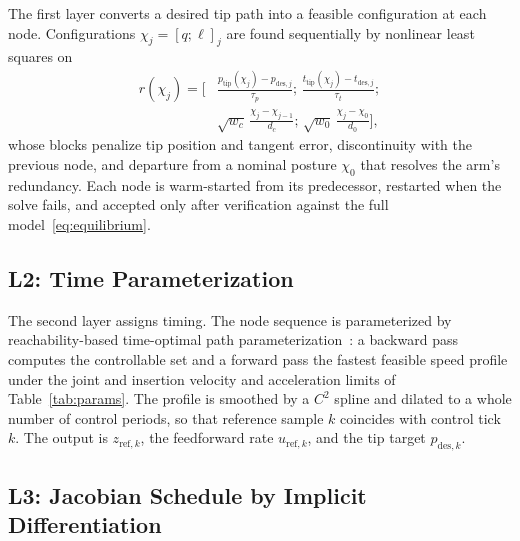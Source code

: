 \documentclass[journal]{IEEEtran}
\begin{document}
The first layer converts a desired tip path into a feasible configuration
at each node. Configurations $\chi_j=[q;\ell]_j$ are found sequentially by
nonlinear least squares on
\begin{equation}
\begin{aligned}
r(\chi_j)=\Big[&\tfrac{p_{\mathrm{tip}}(\chi_j)-p_{\mathrm{des},j}}{\tau_p};\,
\tfrac{t_{\mathrm{tip}}(\chi_j)-t_{\mathrm{des},j}}{\tau_t};\\
&\sqrt{w_c}\,\tfrac{\chi_j-\chi_{j-1}}{d_c};\,
\sqrt{w_0}\,\tfrac{\chi_j-\chi_0}{d_0}\Big],
\end{aligned}
\label{eq:planner}
\end{equation}
whose blocks penalize tip position and tangent error, discontinuity with
the previous node, and departure from a nominal posture $\chi_0$ that
resolves the arm's redundancy. Each node is warm-started from its
predecessor, restarted when the solve fails, and accepted only after
verification against the full model~\eqref{eq:equilibrium}.

\subsection{L2: Time Parameterization}
\label{sec:l2}

The second layer assigns timing. The node sequence is parameterized by
reachability-based time-optimal path
parameterization~\cite{bobrow1985timeoptimal,shinmckay1985minimumtime,
phampham2018reachability}: a backward pass computes the controllable set
and a forward pass the fastest feasible speed profile under the joint and
insertion velocity and acceleration limits of Table~\ref{tab:params}. The
profile is smoothed by a $C^2$ spline and dilated to a whole number of
control periods, so that reference sample $k$ coincides with control tick
$k$. The output is $z_{\mathrm{ref},k}$, the feedforward rate
$u_{\mathrm{ref},k}$, and the tip target $p_{\mathrm{des},k}$.

\subsection{L3: Jacobian Schedule by Implicit Differentiation}
\label{sec:l3}
\end{document}
